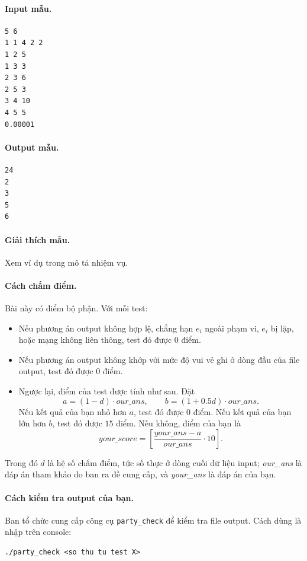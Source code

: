\documentclass[11pt]{article}
\begin{document}
\paragraph{Input mẫu.}
\begin{verbatim}
5 6
1 1 4 2 2
1 2 5
1 3 3
2 3 6
2 5 3
3 4 10
4 5 5
0.00001
\end{verbatim}

\paragraph{Output mẫu.}
\begin{verbatim}
24
2
3
5
6
\end{verbatim}

\paragraph{Giải thích mẫu.}
Xem ví dụ trong mô tả nhiệm vụ.

\paragraph{Cách chấm điểm.}
Bài này có điểm bộ phận. Với mỗi test:
\begin{itemize}
  \item Nếu phương án output không hợp lệ, chẳng hạn $e_i$ ngoài phạm vi,
  $e_i$ bị lặp, hoặc mạng không liên thông, test đó được $0$ điểm.
  \item Nếu phương án output không khớp với mức độ vui vẻ ghi ở dòng đầu của
  file output, test đó được $0$ điểm.
  \item Ngược lại, điểm của test được tính như sau. Đặt
  \[
    a=(1-d)\cdot\textit{our\_ans},\qquad
    b=(1+0.5d)\cdot\textit{our\_ans}.
  \]
  Nếu kết quả của bạn nhỏ hơn $a$, test đó được $0$ điểm. Nếu kết quả của bạn
  lớn hơn $b$, test đó được $15$ điểm. Nếu không, điểm của bạn là
  \[
    \textit{your\_score}
    =\left[
      \frac{\textit{your\_ans}-a}{\textit{our\_ans}}\cdot 10
    \right].
  \]
\end{itemize}
Trong đó $d$ là hệ số chấm điểm, tức số thực ở dòng cuối dữ liệu input;
\textit{our\_ans} là đáp án tham khảo do ban ra đề cung cấp, và
\textit{your\_ans} là đáp án của bạn.

\paragraph{Cách kiểm tra output của bạn.}
Ban tổ chức cung cấp công cụ \texttt{party\_check} để kiểm tra file output.
Cách dùng là nhập trên console:
\begin{verbatim}
./party_check <so thu tu test X>
\end{verbatim}
\end{document}

